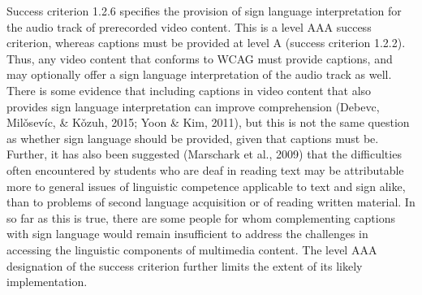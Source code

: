 \documentclass{sig-alternate} %
\begin{document}
\begin{large}
Success criterion 1.2.6 specifies the provision of sign language interpretation for the audio track of prerecorded video content. This is a level AAA success criterion, whereas captions must be provided at level A (success criterion 1.2.2). Thus, any video content that conforms to WCAG must provide captions, and may optionally offer a sign language interpretation of the audio track as well. There is some evidence that including captions in video content that also provides sign language interpretation can improve comprehension (Debevc, Milǒsevíc, \& Kǒzuh, 2015; Yoon \& Kim, 2011), but this is not the same question as whether sign language should be provided, given that captions must be. Further, it has also been suggested (Mar\-schark et al., 2009) that the difficulties often encountered by students who are deaf in reading text may be attributable more to general issues of linguistic competence applicable to text and sign alike, than to problems of second language acquisition or of reading written material. In so far as this is true, there are some people for whom complementing captions with sign language would remain insufficient to address the challenges in accessing the linguistic components of multimedia content. The level AAA designation of the success criterion further limits the extent of its likely implementation.


\end{large}
\end{document}
